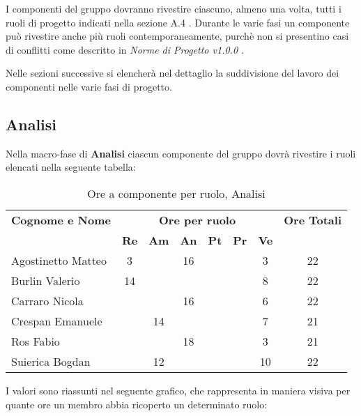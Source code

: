 I componenti del gruppo dovranno rivestire ciascuno, almeno una volta, tutti i ruoli di progetto indicati nella sezione A.4 . Durante le varie fasi un componente può rivestire anche più ruoli contemporaneamente, purchè non si presentino casi di conflitti come descritto in \textit{Norme di Progetto v1.0.0} .

\noindent Nelle sezioni successive si elencherà nel dettaglio la suddivisione del lavoro dei componenti nelle varie fasi di progetto.

\subsection{Analisi}
Nella macro-fase di \textbf{Analisi} ciascun componente del gruppo dovrà rivestire i ruoli elencati nella seguente tabella:

\begin{table}[h]
\centering
\begin{tabular}{|l|c|c|c|c|c|c|c|}
\toprule
	\textbf{Cognome e Nome} & \multicolumn{6}{c}{\textbf{Ore per ruolo}} & \textbf{Ore Totali} \\
	& \textbf{Re} & \textbf{Am} & \textbf{An} & \textbf{Pt} & \textbf{Pr} & \textbf{Ve} & \\
	 
\midrule
	Agostinetto Matteo & 3 & & 16 & & & 3 & 22 \\
	Burlin Valerio & 14 & & & & & 8 & 22 \\ 
	Carraro Nicola & & & 16 & & & 6 & 22 \\
	Crespan Emanuele & & 14 & & & & 7 & 21 \\
	Ros Fabio & & & 18 & & & 3 & 21 \\
	Suierica Bogdan & & 12 & & & & 10 & 22 \\

\bottomrule
\end{tabular}
\caption{Ore a componente per ruolo, Analisi}
\end{table}

\noindent I valori sono riassunti nel seguente grafico, che rappresenta in maniera visiva per quante ore un membro abbia ricoperto un determinato ruolo:

